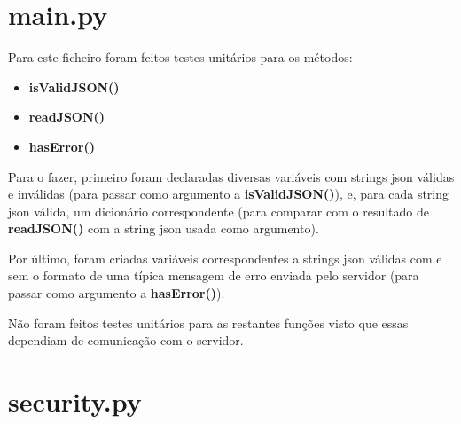 \documentclass{report}
\begin{document}
\section{main.py}
Para este ficheiro foram feitos testes unitários para os métodos:
\begin{itemize}
  \item \textbf{isValidJSON()}
  \item \textbf{readJSON()}
  \item \textbf{hasError()}
\end{itemize}

\hfill

Para o fazer, primeiro foram declaradas diversas variáveis com strings \ac{json} válidas e inválidas (para passar como argumento a \textbf{isValidJSON()}), e, para cada string \ac{json} válida, um dicionário correspondente (para comparar com o resultado de \textbf{readJSON()} com a string \ac{json} usada como argumento).\newline

Por último, foram criadas variáveis correspondentes a strings \ac{json} válidas com e sem o formato de uma típica mensagem de erro enviada pelo servidor (para passar como argumento a \textbf{hasError()}).\newline

Não foram feitos testes unitários para as restantes funções visto que essas dependiam de comunicação com o servidor.

\section{security.py}
\end{document}
